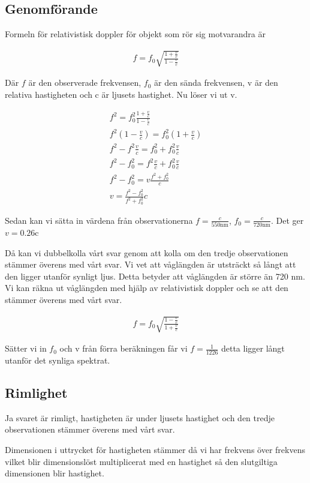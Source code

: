 \documentclass[a4paper]{article}
\begin{document}
\subsection{Genomförande}

Formeln för relativistisk doppler för objekt som rör sig motvarandra är

\begin{align*}
    f = f_0 \sqrt{\frac{1 + \frac{v}{c}}{1 - \frac{v}{c}}}
\end{align*}

Där $f$ är den observerade frekvensen, $f_0$ är den sända frekvensen, v är den relativa hastigheten och c är ljusets hastighet. Nu löser vi ut v.

\begin{align*}
    f^2 = f_0^2 \frac{1 + \frac{v}{c}}{1 - \frac{v}{c}} \\
    f^2 (1 - \frac{v}{c}) = f_0^2 (1 + \frac{v}{c}) \\
    f^2 - f^2 \frac{v}{c} = f_0^2 + f_0^2 \frac{v}{c} \\
    f^2 - f_0^2 = f^2 \frac{v}{c} + f_0^2 \frac{v}{c} \\
    f^2 - f_0^2 = v \frac{f^2 + f_0^2}{c} \\
    v = \frac{f^2 - f_0^2}{f^2 + f_0^2} c
\end{align*}

Sedan kan vi sätta in värdena från observationerna $f = \frac{c}{550\text{nm}}$, $f_0 = \frac{c}{720\text{nm}}$. Det ger $v= 0.26$c

Då kan vi dubbelkolla vårt svar genom att kolla om den tredje observationen stämmer överens med vårt svar. Vi vet att våglängden är utsträckt så långt att den ligger utanför synligt ljus. Detta betyder att våglängden är större än 720 nm. Vi kan räkna ut våglängden med hjälp av relativistisk doppler och se att den stämmer överens med vårt svar.

\begin{align*}
    f = f_0 \sqrt{\frac{1 - \frac{v}{c}}{1 + \frac{v}{c}}}
\end{align*}

Sätter vi in $f_0$ och v från förra beräkningen får vi $f = \frac{1}{1226}$ detta ligger långt utanför det synliga spektrat.

\subsection{Rimlighet}
Ja svaret är rimligt, hastigheten är under ljusets hastighet och den tredje observationen stämmer överens med vårt svar.

Dimensionen i uttrycket för hastigheten stämmer då vi har frekvens över frekvens vilket blir dimensionslöst multiplicerat med en hastighet så den slutgiltiga dimensionen blir hastighet.
\end{document}

